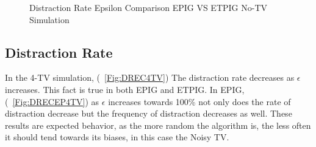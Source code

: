 \documentclass[12pt]{thesis}
\begin{document}
\begin{figure}	
	\begin{center}
		\hfill
		
		\hfill
	\end{center}	
	\caption{Distraction Rate Epsilon Comparison EPIG VS ETPIG No-TV Simulation}
	\label{Fig:DREC0TV}
\end{figure}


\subsection{Distraction Rate}
In the 4-TV simulation, (\figurename~\ref{Fig:DREC4TV}) The distraction rate decreases as $\epsilon$ increases. This fact is true in both EPIG and ETPIG. In EPIG, (\figurename~\ref{Fig:DRECEP4TV}) as $\epsilon$ increases towards 100\% not only does the rate of distraction decrease but the frequency of distraction decreases as well. These results are expected behavior, as the more random the algorithm is, the less often it should tend towards its biases, in this case the Noisy TV.
\end{document}
